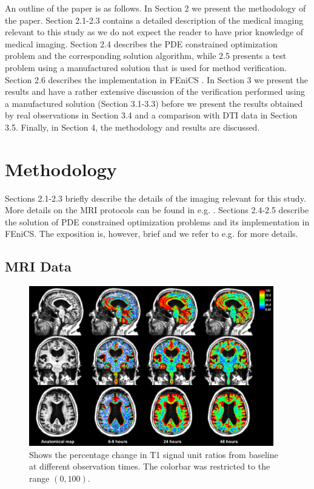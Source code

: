 \documentclass[11pt,a4paper]{article}
\begin{document}
An outline of the paper is as follows. 
In Section 2 we present the methodology of the paper. Section 2.1-2.3 contains a detailed description of the medical imaging 
relevant to this study as we do not expect the reader to have prior knowledge of medical imaging. Section 2.4
describes the PDE constrained optimization problem and the corresponding solution algorithm, while 2.5 presents
a test problem using a manufactured solution that is used for method verification. Section 2.6 describes the implementation 
in FEniCS \cite{LoggMardalEtAl2012a}. In Section 3 we present the results and have a rather extensive discussion of the verification performed
using a manufactured solution (Section 3.1-3.3) before we present the results obtained by real observations in Section 3.4     
and a comparison with DTI data in Section 3.5. Finally, in Section 4, the methodology and results are discussed.  
   
\section{Methodology}

Sections 2.1-2.3 briefly describe the details of the imaging relevant for this study. More details on the MRI protocols can be
found in e.g. \cite{ringstad2018brain}. Sections 2.4-2.5 describe the solution of PDE constrained optimization problems and
its implementation in FEniCS. The exposition is, however, brief and we refer to e.g. \cite{hinze2008optimization} for more details. 



\subsection{MRI Data}
\begin{figure}
\includegraphics[width=0.95\textwidth]{PatID-68-new-100.png} 
\caption{Shows the percentage change in T1 signal unit ratios from baseline at different observation times. The colorbar was restricted to the range $(0,100)$. }
\label{fig1} 
\end{figure}
\end{document}
